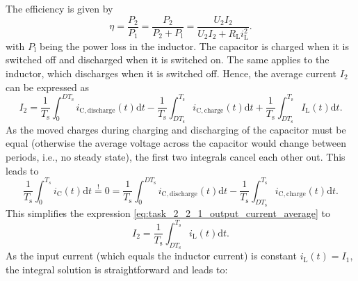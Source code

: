 \begin{solutionblock}
	The efficiency is given by
	\begin{equation}
		\eta = \frac{P_\mathrm{2}}{P_\mathrm{1}} = \frac{P_\mathrm{2}}{P_\mathrm{2}+P_\mathrm{l}} = \frac{U_\mathrm{2} I_\mathrm{2}}{U_\mathrm{2} I_\mathrm{2} +R_\mathrm{L} i_\mathrm{L}^2} \label{eq:efficiency}.
	\end{equation}
	with $P_\mathrm{l}$ being the power loss in the inductor. 	The capacitor is charged when it is switched off and discharged when it is switched on. The same applies to the inductor, which discharges when it is switched off. Hence, the average current $I_\mathrm{2}$ can be expressed as
	\begin{equation}
		I_\mathrm{2}=\frac{1}{T_\mathrm{s}} \int_{0}^{DT_\mathrm{s}} i_\mathrm{C, discharge}(t)\mathrm{d}t-\frac{1}{T_\mathrm{s}} \int_{DT_\mathrm{s}}^{T_\mathrm{s}} i_\mathrm{C,charge}(t)\mathrm{d}t+\frac{1}{T_\mathrm{s}} \int_{DT_\mathrm{s}}^{T_\mathrm{s}} I_\mathrm{L}(t)\mathrm{d}t.
		\label{eq:task_2_2_1_output_current_average}
	\end{equation}
	As the moved charges during charging and discharging of the capacitor must be equal (otherwise the average voltage across the capacitor would change between periods, i.e., no steady state), the first two integrals cancel each other out. This leads to
	\begin{equation}
		\frac{1}{T_\mathrm{s}}\int_{0}^{T_s} i_\mathrm{C}(t)\mathrm{d}t \stackrel{!}{=} 0 = \frac{1}{T_\mathrm{s}} \int_{0}^{DT_\mathrm{s}} i_\mathrm{C, discharge}(t)\mathrm{d}t-\frac{1}{T_\mathrm{s}} \int_{DT_\mathrm{s}}^{T_\mathrm{s}} i_\mathrm{C,charge}(t)\mathrm{d}t.
	\end{equation}
	This simplifies the expression \eqref{eq:task_2_2_1_output_current_average} to
	\begin{equation}
		I_\mathrm{2}= \frac{1}{T_\mathrm{s}} \int_{DT_\mathrm{s}}^{T_\mathrm{s}} i_\mathrm{L}(t)\mathrm{d}t.
	\end{equation}
	As the input current (which equals the inductor current) is constant $i_\mathrm{L}(t)=I_1$, the integral solution is straightforward and leads to:

\end{solutionblock}
